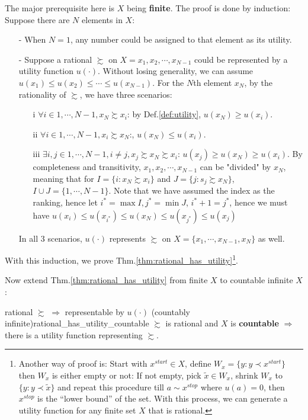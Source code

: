 The major prerequisite here is $X$ being \textbf{finite}. The proof is done by induction: Suppose there are $N$ elements in $X$:
\begin{enumerate}
    \item[-] When $N=1$, any number could be assigned to that element as its utility.
    \item[-] Suppose a rational $\succsim$ on $X={x_1,x_2,\cdots,x_{N-1}}$ could be represented by a utility function $u(\cdot)$. Without losing generality, we can assume $u(x_1)\leq u(x_2)\leq\cdots\leq u(x_{N-1})$. For the $N$th element $x_N$, by the rationality of $\succsim$, we have three scenarios:
    \begin{enumerate}
        \item[i] $\forall i\in {1,\cdots,N-1}, x_N\succsim x_i$: by Def.\ref{def:utility}, $u(x_N)\geq u(x_i)$.
        \item[ii] $\forall i\in {1,\cdots,N-1}, x_i\succsim x_N$:, $u(x_N)\leq u(x_i)$.
        \item[iii] $\exists i,j\in {1,\cdots,N-1}, i\neq j, x_j \succsim x_N\succsim x_i$: $u(x_j)\geq u(x_N)\geq u(x_i)$. By completeness and transitivity, ${x_1,x_2,\cdots,x_{N-1}}$ can be "divided" by $x_N$, meaning that for $I=\{i:x_N\succsim x_i\}$ and $J=\{j:s_j\succsim x_N\}$, $I\cup J=\{1,\cdots,N-1\}$. Note that we have assumed the index as the ranking, hence let $i^*=\max I,j^*=\min J$, $i^*+1=j^*$, hence we must have $u(x_i)\leq u(x_{i^*})\leq u(x_N)\leq u(x_{j^*})\leq u(x_j)$
    \end{enumerate}
    In all 3 scenarios, $u(\cdot)$ represents $\succsim$ on $X=\{x_1,\cdots,x_{N-1},x_N\}$ as well.
\end{enumerate}
With this induction, we prove Thm.\ref{thm:rational_has_utility}\footnote{Another way of proof is: Start with $x^{start}\in X$, define $W_{x}=\{y:y\prec x^{start}\}$ then $W_x$ is either empty or not: If not empty, pick $\tilde{x}\in W_{x}$, shrink $W_{x}$ to $\{y:y\prec \tilde{x}\}$ and repeat this procedure till $a\sim x^{stop}$ where $u(a)=0$, then $x^{stop}$ is the “lower bound” of the set. With this process, we can generate a utility function for any finite set $X$ that is rational.}.

Now extend Thm.\ref{thm:rational_has_utility} from finite $X$ to countable infinite $X$:
\begin{theorem}{rational $\succsim$ $\Rightarrow$ representable by $u(\cdot)$ (countably infinite)}{rational_has_utility_countable}
    $\succsim$ is rational and $X$ is \textbf{countable} $\Rightarrow$ there is a utility function representing $\succsim$.
\end{theorem}


